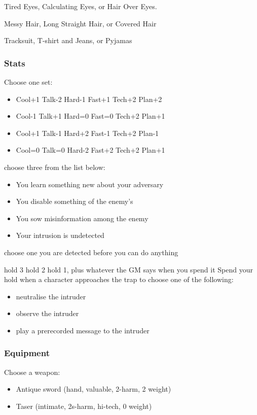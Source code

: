 Tired Eyes, Calculating Eyes, or Hair Over Eyes.

Messy Hair, Long Straight Hair, or Covered Hair

Tracksuit, T-shirt and Jeans, or Pyjamas

\subsubsection{Stats}
Choose one set:
\begin{itemize}
\setlength\itemsep{0em}
\item Cool+1 Talk-2 Hard-1 Fast+1 Tech+2 Plan+2
\item Cool-1 Talk+1 Hard=0 Fast=0 Tech+2 Plan+1
\item Cool+1 Talk-1 Hard+2 Fast-1 Tech+2 Plan-1
\item Cool=0 Talk=0 Hard-2 Fast+2 Tech+2 Plan+1
\end{itemize}

{choose three from the list below:
\begin{itemize}
\item You learn something new about your adversary
\item You disable something of the enemy's
\item You sow misinformation among the enemy
\item Your intrusion is undetected
\end{itemize}}
{choose one}
{you are detected before you can do anything}

{hold 3}
{hold 2}
{hold 1, plus whatever the GM says when you spend it}
Spend your hold when a character approaches the trap to choose one of the following:
\begin{itemize}
\item neutralise the intruder
\item observe the intruder
\item play a prerecorded message to the intruder
\end{itemize}


\subsubsection{Equipment}
Choose a weapon:
\begin{itemize}
\item Antique sword (hand, valuable, 2-harm, 2 weight)
\item Taser (intimate, 2s-harm, hi-tech, 0 weight)
\end{itemize}

